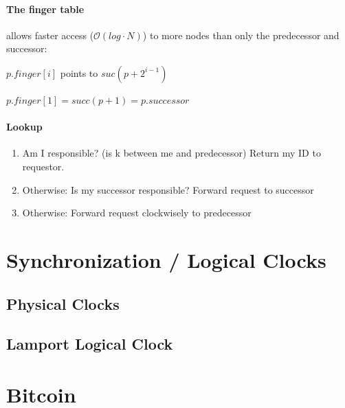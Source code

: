 \paragraph{The finger table} allows faster access ($\mathcal{O}(log \cdot N)$) to more nodes than only the predecessor and successor:

$p.finger[i]$ points to $suc(p + 2^{i-1})$

$p.finger[1] = succ(p + 1) = p.successor$

\paragraph{Lookup} 
\begin{enumerate}
	\item Am I responsible? (is k between me and predecessor) Return my ID to requestor.
	\item Otherwise: Is my successor responsible? Forward request to successor
	\item Otherwise: Forward request clockwisely to predecessor
\end{enumerate}


\section{Synchronization / Logical Clocks}



\subsection{Physical Clocks}



\subsection{Lamport Logical Clock}



\section{Bitcoin}



